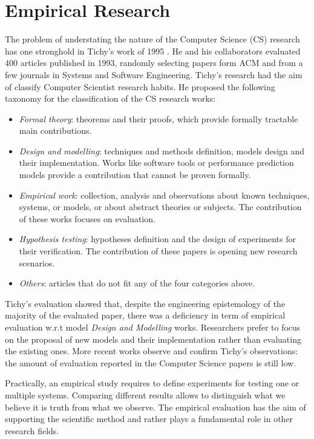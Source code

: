 \section{Empirical Research}\label{sec:empirical-research}

The problem of understating the nature of the Computer Science (CS) research has one stronghold in Tichy's work of 1995 \cite{Tichy:1995:EEC:209090.209093}. He and his collaborators evaluated 400 articles published in 1993, randomly selecting papers form ACM and from a few journals in Systems and Software Engineering. Tichy's research had the aim of classify Computer Scientist research habits. He proposed the following taxonomy \cite{Tichy:1995:EEC:209090.209093} for the classification of the CS research works:
\begin{itemize}
\item \textit{Formal theory}: theorems and their proofs, which provide formally tractable main contributions. 
\item \textit{Design and modelling}:  techniques and methods definition, models design and their implementation. Works like  software tools or performance prediction models provide a contribution that cannot be proven formally.
\item \textit{Empirical work}: collection, analysis and observations about known techniques, systems, or models, or about abstract theories or subjects. The contribution of these works focuses on evaluation.
\item \textit{Hypothesis testing}: hypotheses definition and the design of experiments for their verification. The contribution of these papers is opening new research scenarios.
\item \textit{Others}: articles that do not fit any of the four categories above.
\end{itemize}

Tichy's evaluation showed that, despite the engineering epistemology of the majority of the evaluated paper, there was a deficiency in term of empirical evaluation w.r.t model \textit{Design and Modelling} works. Researchers prefer to focus on the proposal of new models and their implementation rather than evaluating the existing ones. More recent works \cite{Wainer:2009:EEC:1518331.1518552} observe and confirm Tichy's observations: the amount of evaluation reported in the Computer Science papers is still low.

Practically, an empirical study requires to define experiments for testing one or multiple systems. Comparing different results allows to distinguish what we believe it is truth from what we observe. The empirical evaluation has the aim of supporting the scientific method and rather plays a fundamental role in other research fields.

